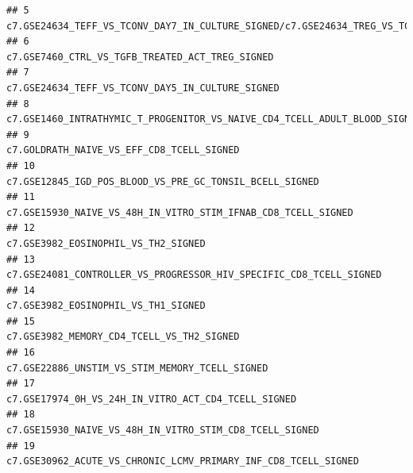 \documentclass{article}\usepackage[]{graphicx}\usepackage[]{color}
\makeatletter
\newenvironment{kframe}{%
 \def\at@end@of@kframe{}%
 \ifinner\ifhmode%
  \def\at@end@of@kframe{\end{minipage}}%
  \begin{minipage}{\columnwidth}%
 \fi\fi%
 \def\FrameCommand##1{\hskip\@totalleftmargin \hskip-\fboxsep
 \colorbox{shadecolor}{##1}\hskip-\fboxsep
     \hskip-\linewidth \hskip-\@totalleftmargin \hskip\columnwidth}%
 \MakeFramed {\advance\hsize-\width
   \@totalleftmargin\z@ \linewidth\hsize
   \@setminipage}}%
 {\par\unskip\endMakeFramed%
 \at@end@of@kframe}
\newenvironment{knitrout}{}{} %
\makeatother
\begin{document}
\begin{knitrout}
\begin{kframe}
\begin{verbatim}
## 5                                                                          c7.GSE24634_TEFF_VS_TCONV_DAY7_IN_CULTURE_SIGNED/c7.GSE24634_TREG_VS_TCONV_POST_DAY7_IL4_CONVERSION_SIGNED
## 6                                                                                                                                     c7.GSE7460_CTRL_VS_TGFB_TREATED_ACT_TREG_SIGNED
## 7                                                                                                                                    c7.GSE24634_TEFF_VS_TCONV_DAY5_IN_CULTURE_SIGNED
## 8                                                                                                           c7.GSE1460_INTRATHYMIC_T_PROGENITOR_VS_NAIVE_CD4_TCELL_ADULT_BLOOD_SIGNED
## 9                                                                                                                                           c7.GOLDRATH_NAIVE_VS_EFF_CD8_TCELL_SIGNED
## 10                                                                                                                            c7.GSE12845_IGD_POS_BLOOD_VS_PRE_GC_TONSIL_BCELL_SIGNED
## 11                                                                                                                      c7.GSE15930_NAIVE_VS_48H_IN_VITRO_STIM_IFNAB_CD8_TCELL_SIGNED
## 12                                                                                                                                                c7.GSE3982_EOSINOPHIL_VS_TH2_SIGNED
## 13                                                                                                                 c7.GSE24081_CONTROLLER_VS_PROGRESSOR_HIV_SPECIFIC_CD8_TCELL_SIGNED
## 14                                                                                                                                                c7.GSE3982_EOSINOPHIL_VS_TH1_SIGNED
## 15                                                                                                                                          c7.GSE3982_MEMORY_CD4_TCELL_VS_TH2_SIGNED
## 16                                                                                                                                     c7.GSE22886_UNSTIM_VS_STIM_MEMORY_TCELL_SIGNED
## 17                                                                                                                                c7.GSE17974_0H_VS_24H_IN_VITRO_ACT_CD4_TCELL_SIGNED
## 18                                                                                                                            c7.GSE15930_NAIVE_VS_48H_IN_VITRO_STIM_CD8_TCELL_SIGNED
## 19                                                                                                                     c7.GSE30962_ACUTE_VS_CHRONIC_LCMV_PRIMARY_INF_CD8_TCELL_SIGNED

\end{verbatim}
\end{kframe}
\end{knitrout}
\end{document}

